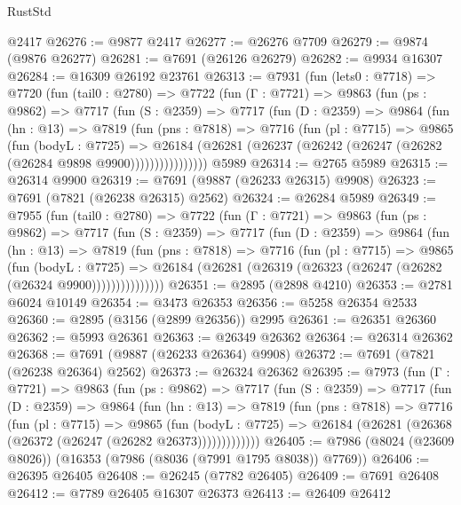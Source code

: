 \begin{lexlean}{RustStd}
\begin{coremodule}
    @2417
@26276 := @9877 @2417
@26277 := @26276 @7709
@26279 := @9874 (@9876 @26277)
@26281 := @7691 (@26126 @26279)
@26282 := @9934 @16307
@26284 := @16309 @26192 @23761
@26313 := @7931
    (fun (lets0 : @7718) =>
    @7720
      (fun (tail0 : @2780) =>
      @7722
        (fun (Γ : @7721) =>
        @9863
          (fun (ps : @9862) =>
          @7717
            (fun (S : @2359) =>
            @7717
              (fun (D : @2359) =>
              @9864
                (fun (hn : @13) =>
                @7819
                  (fun (pns : @7818) =>
                  @7716
                    (fun (pl : @7715) =>
                    @9865
                      (fun (bodyL : @7725) =>
                      @26184
                        (@26281 (@26237 (@26242 (@26247 (@26282 (@26284 @9898 @9900))))))))))))))))
    @5989
@26314 := @2765 @5989
@26315 := @26314 @9900
@26319 := @7691 (@9887 (@26233 @26315) @9908)
@26323 := @7691 (@7821 (@26238 @26315) @2562)
@26324 := @26284 @5989
@26349 := @7955
    (fun (tail0 : @2780) =>
    @7722
      (fun (Γ : @7721) =>
      @9863
        (fun (ps : @9862) =>
        @7717
          (fun (S : @2359) =>
          @7717
            (fun (D : @2359) =>
            @9864
              (fun (hn : @13) =>
              @7819
                (fun (pns : @7818) =>
                @7716
                  (fun (pl : @7715) =>
                  @9865
                    (fun (bodyL : @7725) =>
                    @26184 (@26281 (@26319 (@26323 (@26247 (@26282 (@26324 @9900)))))))))))))))
@26351 := @2895 (@2898 @4210)
@26353 := @2781 @6024 @10149
@26354 := @3473 @26353
@26356 := @5258 @26354 @2533
@26360 := @2895 (@3156 (@2899 @26356)) @2995
@26361 := @26351 @26360
@26362 := @5993 @26361
@26363 := @26349 @26362
@26364 := @26314 @26362
@26368 := @7691 (@9887 (@26233 @26364) @9908)
@26372 := @7691 (@7821 (@26238 @26364) @2562)
@26373 := @26324 @26362
@26395 := @7973
    (fun (Γ : @7721) =>
    @9863
      (fun (ps : @9862) =>
      @7717
        (fun (S : @2359) =>
        @7717
          (fun (D : @2359) =>
          @9864
            (fun (hn : @13) =>
            @7819
              (fun (pns : @7818) =>
              @7716
                (fun (pl : @7715) =>
                @9865
                  (fun (bodyL : @7725) =>
                  @26184 (@26281 (@26368 (@26372 (@26247 (@26282 @26373)))))))))))))
@26405 := @7986 (@8024 (@23609 @8026)) (@16353 (@7986 (@8036 (@7991 @1795 @8038)) @7769))
@26406 := @26395 @26405
@26408 := @26245 (@7782 @26405)
@26409 := @7691 @26408
@26412 := @7789 @26405 @16307 @26373
@26413 := @26409 @26412

\end{coremodule}
\end{lexlean}
